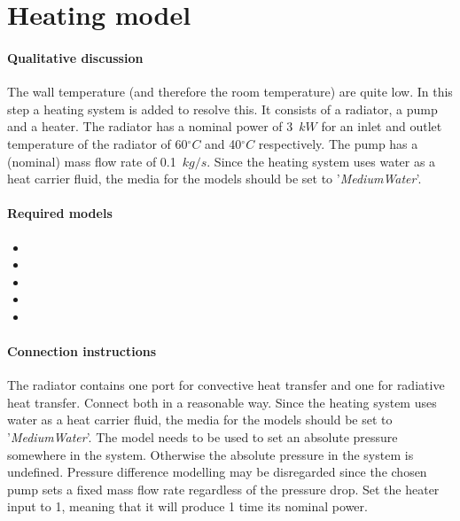 \documentclass[10pt,a4paper]{article}
\begin{document}
\section{Heating model}
\paragraph{Qualitative discussion}
The wall temperature (and therefore the room temperature) are quite low. 
In this step a heating system is added to resolve this.
It consists of a radiator, a pump and a heater.
The radiator has a nominal power of 3~$kW$ for an inlet and outlet temperature of the radiator of 60$^{\circ}C$ and 40$^{\circ}C$ respectively.
The pump has a (nominal) mass flow rate of 0.1~$kg/s$.
Since the heating system uses water as a heat carrier fluid, 
the media for the models should be set to '\textit{MediumWater}'.

\paragraph{Required models}
\begin{itemize}
\item {}
\item {}
\item {}
\item {}
\item {}
\end{itemize}

\paragraph{Connection instructions}
The radiator contains one port for convective 
heat transfer and one for radiative heat transfer.
Connect both in a reasonable way.
Since the heating system uses water as a heat carrier fluid, 
the media for the models should be set to '\textit{MediumWater}'.
The  model needs to be used to set an absolute
pressure somewhere in the system. 
Otherwise the absolute 
pressure in the system is undefined.
Pressure difference modelling may be disregarded since the chosen pump
sets a fixed mass flow rate regardless of the pressure drop.
Set the heater input to 1, meaning that it will
produce 1 time its nominal power.
\end{document}

